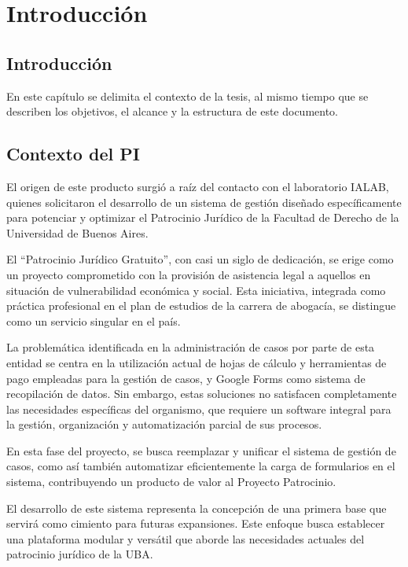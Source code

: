 \chapter{Introducción}
\label{cap:introduccion}

\section{Introducción}
\label{sec:introduccion:intro}
En este capítulo se delimita el contexto de la tesis, al mismo tiempo que se describen los objetivos, el alcance y la estructura de este documento.

\section{Contexto del PI}
\label{sec:introduccion:contexto}
El origen de este producto surgió a raíz del contacto con el laboratorio IALAB, quienes solicitaron el desarrollo de un sistema de gestión diseñado específicamente para potenciar y optimizar el Patrocinio Jurídico de la Facultad de Derecho de la Universidad de Buenos Aires.

El ``Patrocinio Jurídico Gratuito'', con casi un siglo de dedicación, se erige como un proyecto comprometido con la provisión de asistencia legal a aquellos en situación de vulnerabilidad económica y social. Esta iniciativa, integrada como práctica profesional en el plan de estudios de la carrera de abogacía, se distingue como un servicio singular en el país.

La problemática identificada en la administración de casos por parte de esta entidad se centra en la utilización actual de hojas de cálculo y herramientas de pago empleadas para la gestión de casos, y Google Forms como sistema de recopilación de datos. Sin embargo, estas soluciones no satisfacen completamente las necesidades específicas del organismo, que requiere un software integral para la gestión, organización y automatización parcial de sus procesos.

En esta fase del proyecto, se busca reemplazar y unificar el sistema de gestión de casos, como así también automatizar eficientemente la carga de formularios en el sistema, contribuyendo un producto de valor al Proyecto Patrocinio.

El desarrollo de este sistema representa la concepción de una primera base que servirá como cimiento para futuras expansiones. Este enfoque busca establecer una plataforma modular y versátil que aborde las necesidades actuales del patrocinio jurídico de la UBA.



